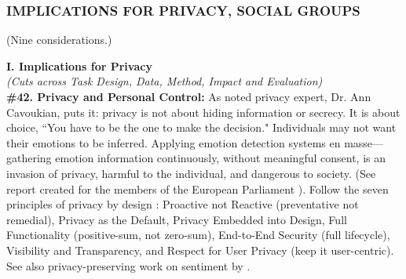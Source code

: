 \documentclass{clv3}
\begin{document}


\subsubsection{IMPLICATIONS FOR PRIVACY, SOCIAL GROUPS} (Nine considerations.)\\
\label{sec:privacysg}


\noindent \textbf{I. Implications for Privacy}\\
\noindent \textit{(Cuts across Task Design, Data, Method, Impact and Evaluation)}\\

\noindent \textbf{\#42. Privacy and Personal Control:} As noted privacy expert, %
Dr. Ann Cavoukian, puts it: privacy is not about hiding information or secrecy. It is about choice, ``You have to be the one to make the decision."
    Individuals may not want their emotions to be inferred. 
Applying emotion detection systems en masse---gathering emotion information continuously, without meaningful consent, is an invasion of privacy, harmful to the individual, and dangerous to society. (See report  created for the members of the European Parliament \cite{woensel_nevil_2019}).
Follow the seven principles of privacy by design \cite{schaar2010privacy}:
    Proactive not Reactive (preventative not remedial), 
    Privacy as the Default,
    Privacy Embedded into Design,
    Full Functionality (positive-sum, not zero-sum),
    End-to-End Security (full lifecycle),
    Visibility and Transparency, and
    Respect for User Privacy (keep it user-centric).
See also privacy-preserving work on sentiment by \citet{thaine-penn-2021-chinese}.\\
\end{document}
